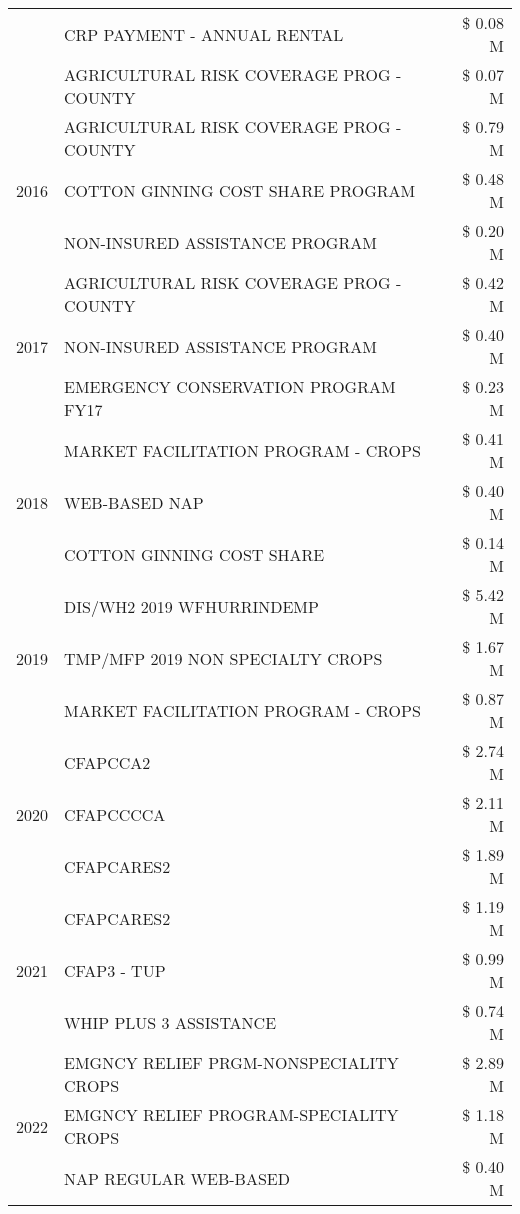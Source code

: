 \begin{tabular}{llr}
 & CRP PAYMENT - ANNUAL RENTAL & \$ 0.08 M \\
 & AGRICULTURAL RISK COVERAGE PROG - COUNTY & \$ 0.07 M \\
\cline{1-3}
\multirow[t]{3}{*}{2016} & AGRICULTURAL RISK COVERAGE PROG - COUNTY & \$ 0.79 M \\
 & COTTON GINNING COST SHARE PROGRAM & \$ 0.48 M \\
 & NON-INSURED ASSISTANCE PROGRAM & \$ 0.20 M \\
\cline{1-3}
\multirow[t]{3}{*}{2017} & AGRICULTURAL RISK COVERAGE PROG - COUNTY & \$ 0.42 M \\
 & NON-INSURED ASSISTANCE PROGRAM & \$ 0.40 M \\
 & EMERGENCY CONSERVATION PROGRAM FY17 & \$ 0.23 M \\
\cline{1-3}
\multirow[t]{3}{*}{2018} & MARKET FACILITATION PROGRAM - CROPS & \$ 0.41 M \\
 & WEB-BASED NAP & \$ 0.40 M \\
 & COTTON GINNING COST SHARE & \$ 0.14 M \\
\cline{1-3}
\multirow[t]{3}{*}{2019} & DIS/WH2 2019 WFHURRINDEMP & \$ 5.42 M \\
 & TMP/MFP 2019 NON SPECIALTY CROPS & \$ 1.67 M \\
 & MARKET FACILITATION PROGRAM - CROPS & \$ 0.87 M \\
\cline{1-3}
\multirow[t]{3}{*}{2020} & CFAPCCA2 & \$ 2.74 M \\
 & CFAPCCCCA & \$ 2.11 M \\
 & CFAPCARES2 & \$ 1.89 M \\
\cline{1-3}
\multirow[t]{3}{*}{2021} & CFAPCARES2 & \$ 1.19 M \\
 & CFAP3 - TUP & \$ 0.99 M \\
 & WHIP PLUS 3 ASSISTANCE & \$ 0.74 M \\
\cline{1-3}
\multirow[t]{3}{*}{2022} & EMGNCY RELIEF PRGM-NONSPECIALITY CROPS & \$ 2.89 M \\
 & EMGNCY RELIEF PROGRAM-SPECIALITY CROPS & \$ 1.18 M \\
 & NAP REGULAR WEB-BASED & \$ 0.40 M \\
\cline{1-3}
\bottomrule
\end{tabular}
